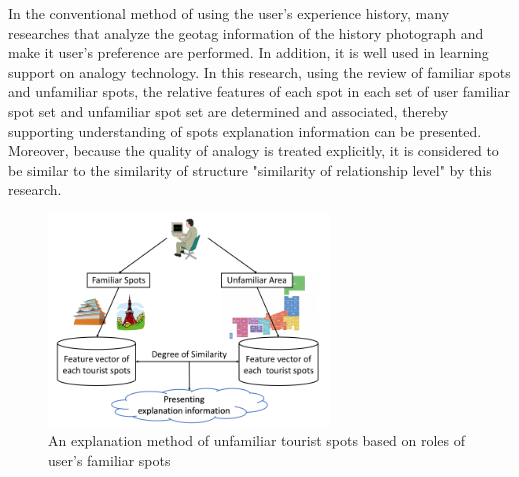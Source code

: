 \documentclass[journal]{IAENGtran}
\begin{document}
In the conventional method of using the user's experience history, many researches that analyze the geotag information of the history photograph and make it user's preference are performed.
In addition, it is well used in learning support on analogy technology.
In this research, using the review of familiar spots and unfamiliar spots, the relative features of each spot in each set of user familiar spot set and unfamiliar spot set are determined and associated, thereby supporting understanding of spots explanation information can be presented.
Moreover, because the quality of analogy is treated explicitly, it is considered to be similar to the similarity of structure "similarity of relationship level" by this research.

\begin{figure}[t]
  \begin{center}
    \includegraphics[clip,width=7.5cm,bb=0 0 720 540]{picture/Photo_Image_eng.png}
    \caption{An explanation method of unfamiliar tourist spots based on roles of user's familiar spots}
    \label{fig:Photo_Image}
   \end{center}
\end{figure}

\end{document}
